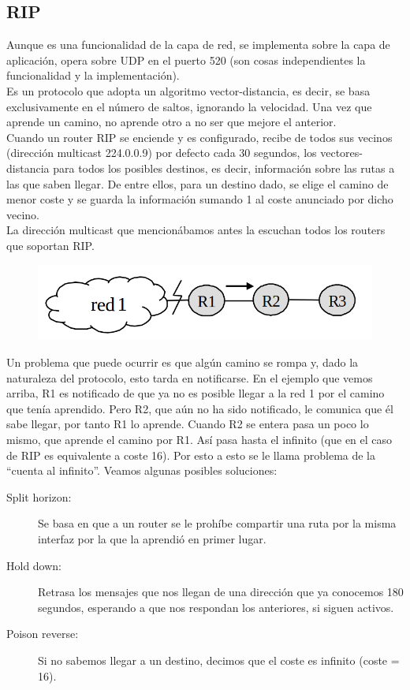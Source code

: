 \subsection{\acrfull{RIP}}

Aunque es una funcionalidad de la capa de red, se implementa sobre la capa de aplicación, opera sobre \acrshort{UDP} en el puerto 520 (son cosas independientes la funcionalidad y la implementación). \\

Es un protocolo que adopta un algoritmo vector-distancia, es decir, se basa exclusivamente en el número de saltos, ignorando la velocidad. Una vez que aprende un camino, no aprende otro a no ser que mejore el anterior.\\

Cuando un router RIP se enciende y es configurado, recibe de todos sus vecinos (dirección multicast 224.0.0.9) por defecto cada 30 segundos, los vectores-distancia para todos los posibles destinos, es decir, información sobre las rutas a las que saben llegar. De entre ellos, para un destino dado, se elige el camino de menor coste y se guarda la información sumando 1 al coste anunciado por dicho vecino. \\

La dirección multicast que mencionábamos antes la escuchan todos los routers que soportan \acrshort{RIP}.\\ 

\begin{figure}[H]
    \centering
    \includegraphics[width=0.6\linewidth]{./images/cuenta-infinito-rip.png}
    \label{fig:rip}
\end{figure}

Un problema que puede ocurrir es que algún camino se rompa y, dado la naturaleza del protocolo, esto tarda en notificarse. En el ejemplo que vemos arriba, R1 es notificado de que ya no es posible llegar a la red 1 por el camino que tenía aprendido. Pero R2, que aún no ha sido notificado, le comunica que él sabe llegar, por tanto R1 lo aprende. Cuando R2 se entera pasa un poco lo mismo, que aprende el camino por R1. Así pasa hasta el infinito (que en el caso de \acrshort{RIP} es equivalente a coste 16). Por esto a esto se le llama problema de la ``cuenta al infinito''. Veamos algunas posibles soluciones:
\begin{description}
    \item [Split horizon:] Se basa en que a un router se le prohíbe compartir una ruta por la misma interfaz por la que la aprendió en primer lugar.
    \item [Hold down:] Retrasa los mensajes que nos llegan de una dirección que ya conocemos 180 segundos, esperando a que nos respondan los anteriores, si siguen activos. 
    \item [Poison reverse:] Si no sabemos llegar a un destino, decimos que el coste es infinito (coste = 16).
\end{description}

